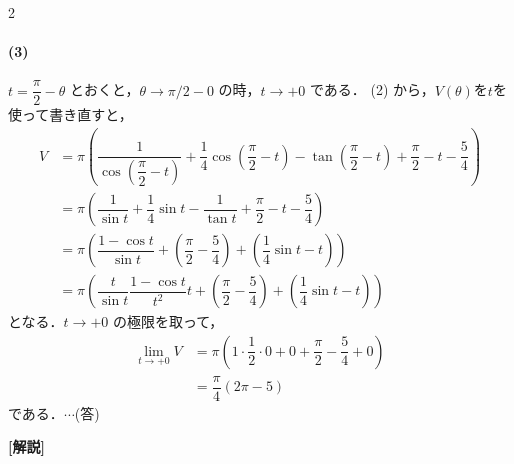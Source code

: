 \documentclass[../../main.tex]{subfiles}
\begin{document}
\begin{multicols}{2}
  \paragraph{(3)}
  $t=\dfrac{\pi}{2}-\theta$ とおくと，$\theta \to \pi/2-0$ の時，$t \to +0$ である．
  (2) から，$V(\theta)$を$t$を使って書き直すと，
  \begin{align}
    V
    & = \pi \left( \dfrac{1}{\cos\left(\dfrac{\pi}{2}-t\right)} + \dfrac{1}{4}\cos\left(\dfrac{\pi}{2}-t\right) - \tan\left(\dfrac{\pi}{2}-t\right) + \dfrac{\pi}{2}-t - \dfrac{5}{4} \right) \\
    & = \pi \left( \dfrac{1}{\sin t} + \dfrac{1}{4}\sin t - \dfrac{1}{\tan t} + \dfrac{\pi}{2}-t - \dfrac{5}{4} \right)                                                                     \\
    & = \pi \left( \dfrac{1-\cos t}{\sin t} + \left(\dfrac{\pi}{2}-\dfrac{5}{4}\right) + \left(\dfrac{1}{4}\sin t - t\right) \right)                                                       \\
    & = \pi \left( \dfrac{t}{\sin t} \dfrac{1-\cos t}{t^2} t + \left(\dfrac{\pi}{2}-\dfrac{5}{4}\right) + \left(\dfrac{1}{4}\sin t - t\right) \right)
  \end{align}
  となる．$t \to +0$ の極限を取って，
  \begin{align}
    \lim_{t \to +0} V
    & = \pi \left( 1 \cdot \dfrac{1}{2} \cdot 0 + 0 + \dfrac{\pi}{2}-\dfrac{5}{4} + 0 \right) \\
    & = \dfrac{\pi}{4}\left(2\pi-5\right)
  \end{align}
  である．$\cdots$(答)

  {\bf [解説]}

  \newpage
\end{multicols}
\end{document}
